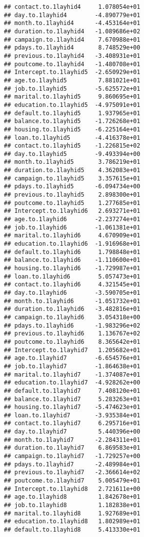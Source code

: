 \documentclass[
]{article}
\begin{document}
\begin{verbatim}
## contact.to.1layhid4     1.078054e+01
## day.to.1layhid4        -4.890779e+01
## month.to.1layhid4      -4.453164e+01
## duration.to.1layhid4   -1.089686e+02
## campaign.to.1layhid4    7.670988e+01
## pdays.to.1layhid4       8.748529e+00
## previous.to.1layhid4   -3.408931e+01
## poutcome.to.1layhid4   -1.480708e+01
## Intercept.to.1layhid5  -2.650929e+01
## age.to.1layhid5         7.881021e+01
## job.to.1layhid5        -5.625572e+01
## marital.to.1layhid5     9.860695e+01
## education.to.1layhid5  -4.975091e+01
## default.to.1layhid5     1.937965e+01
## balance.to.1layhid5    -1.726268e+01
## housing.to.1layhid5    -6.225164e+01
## loan.to.1layhid5       -4.416378e+01
## contact.to.1layhid5    -1.226815e+02
## day.to.1layhid5        -9.493394e+00
## month.to.1layhid5       3.786219e+01
## duration.to.1layhid5    4.362083e+01
## campaign.to.1layhid5    3.357615e+01
## pdays.to.1layhid5      -6.094734e+00
## previous.to.1layhid5    2.898300e+01
## poutcome.to.1layhid5    1.277685e+01
## Intercept.to.1layhid6   2.693271e+01
## age.to.1layhid6        -2.237274e+01
## job.to.1layhid6        -1.061381e+01
## marital.to.1layhid6     4.670909e+01
## education.to.1layhid6  -1.916968e+01
## default.to.1layhid6     1.798848e+01
## balance.to.1layhid6    -1.110600e+01
## housing.to.1layhid6    -1.729987e+01
## loan.to.1layhid6        5.057473e+01
## contact.to.1layhid6     4.321545e+01
## day.to.1layhid6        -3.590705e+01
## month.to.1layhid6      -1.051732e+01
## duration.to.1layhid6   -3.482816e+01
## campaign.to.1layhid6    3.054318e+00
## pdays.to.1layhid6      -1.983296e+02
## previous.to.1layhid6    1.136767e+02
## poutcome.to.1layhid6    8.365642e+01
## Intercept.to.1layhid7   1.205682e+01
## age.to.1layhid7        -6.654576e+01
## job.to.1layhid7        -1.864638e+01
## marital.to.1layhid7    -1.374087e+01
## education.to.1layhid7  -4.928262e+00
## default.to.1layhid7     7.408120e+01
## balance.to.1layhid7     5.283263e+01
## housing.to.1layhid7    -5.474623e+01
## loan.to.1layhid7       -3.935384e+01
## contact.to.1layhid7     6.295716e+01
## day.to.1layhid7         5.440396e+00
## month.to.1layhid7      -2.284311e+01
## duration.to.1layhid7    6.869583e+01
## campaign.to.1layhid7   -1.729257e+00
## pdays.to.1layhid7      -2.489984e+01
## previous.to.1layhid7   -2.366614e+02
## poutcome.to.1layhid7    5.005479e+01
## Intercept.to.1layhid8   2.721611e+00
## age.to.1layhid8         1.842678e+01
## job.to.1layhid8         1.182838e+01
## marital.to.1layhid8     1.927689e+01
## education.to.1layhid8   1.802989e+01
## default.to.1layhid8     5.413330e+01

\end{verbatim}
\end{document}
